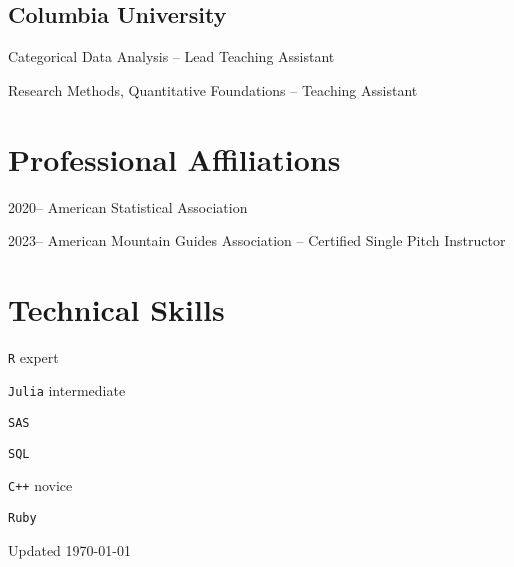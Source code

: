 \documentclass[12pt,letterpaper]{report}
\newcommand{\listitemspace}{0.15em}
\renewenvironment{itemize}
{\begin{list}{}{\setlength{\leftmargin}{0em}
            \setlength{\parskip}{0em}
            \setlength{\itemsep}{\listitemspace}
            \setlength{\parsep}{\listitemspace}}}
    {\end{list}}
\begin{document}
    \subsection*{Columbia University}
    
    \begin{itemize}
    	
    	\item Categorical Data Analysis -- Lead Teaching Assistant
    	\item Research Methods, Quantitative Foundations -- Teaching Assistant
    
    \end{itemize}

    \section*{Professional Affiliations}

    \begin{tablist}

        \item[2020--] \tab American Statistical Association
        
        	\item[2023--] \tab American Mountain Guides Association -- Certified Single Pitch Instructor

    \end{tablist}

    \section*{Technical Skills}

    \begin{itemize}

        \item \texttt{R} \tab expert
        
        \item \texttt{Julia} \tab intermediate
        
        	\item \texttt{SAS}

		\item \texttt{SQL}
        
        \item \texttt{C++} \tab novice
        
        \item \texttt{Ruby}

    \end{itemize}

    \begin{center}
        \vfill
        Updated \monthyeardate\today
    \end{center}
\end{document}
